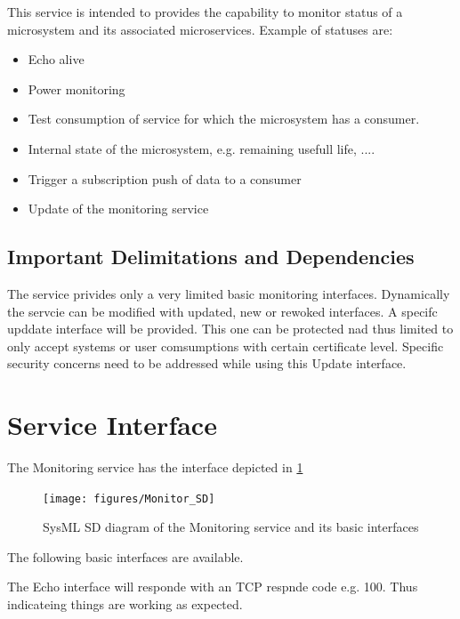 \documentclass[a4paper]{arrowhead}
\begin{document}
This service is intended to provides the capability to monitor status of a
microsystem and its associated microservices. Example of statuses are:
\begin{itemize}
\item Echo alive
\item Power monitoring
\item Test consumption of service for which the microsystem has a
  consumer.
\item Internal state of the microsystem, e.g. remaining
  usefull life, ....
\item Trigger a subscription push of data to a consumer
\item Update of the monitoring service
\end{itemize}





\subsection{Important Delimitations and Dependencies}
\label{sec:delimitations}

The service privides only a very limited basic monitoring interfaces.
Dynamically the servcie can be modified with updated, new or rewoked interfaces. 
A specifc upddate interface will be provided. This one can be
protected nad thus limited to only accept systems or user comsumptions
with certain certificate level. Specific security concerns need to be
addressed while using this Update interface. 


\section{Service Interface}
\label{sec:operations}


The Monitoring service has the interface depicted in \ref{fig:SD}

\begin{figure}[h!]
  \centering
  \texttt{[image: figures/Monitor\_SD]}
  \caption{SysML SD diagram of the Monitoring service and its basic interfaces}
  \label{fig:SD}
\end{figure}

The following basic interfaces are available.



The Echo interface will responde with an TCP respnde code
e.g. 100. Thus indicateing things are working as expected.
\end{document}
